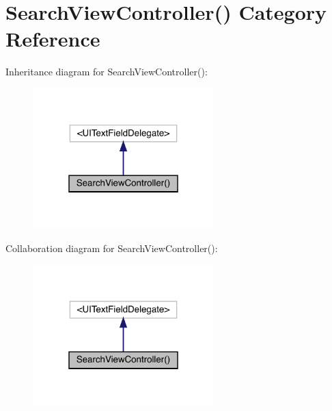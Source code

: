 \hypertarget{category_search_view_controller_07_08}{}\section{Search\+View\+Controller() Category Reference}
\label{category_search_view_controller_07_08}


Inheritance diagram for Search\+View\+Controller()\+:\nopagebreak
\begin{figure}[H]
\begin{center}
\leavevmode
\includegraphics[width=199pt]{category_search_view_controller_07_08__inherit__graph}
\end{center}
\end{figure}


Collaboration diagram for Search\+View\+Controller()\+:\nopagebreak
\begin{figure}[H]
\begin{center}
\leavevmode
\includegraphics[width=199pt]{category_search_view_controller_07_08__coll__graph}
\end{center}
\end{figure}
